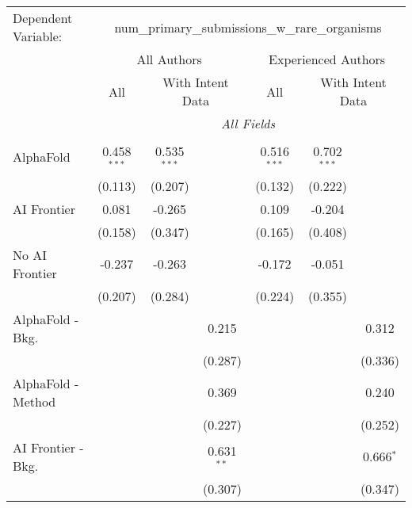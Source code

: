 \begingroup
\centering
\begin{tabular}{lcccccc}
   \tabularnewline \midrule \midrule
   Dependent Variable: & \multicolumn{6}{c}{num\_primary\_submissions\_w\_rare\_organisms}\\
 & \multicolumn{3}{c}{All Authors} & \multicolumn{3}{c}{Experienced Authors} \\
\cmidrule(lr){2-4} \cmidrule(lr){5-7}
 & \multicolumn{1}{c}{All} & \multicolumn{2}{c}{With Intent Data} & \multicolumn{1}{c}{All} & \multicolumn{2}{c}{With Intent Data} \\
\cmidrule(lr){2-2} \cmidrule(lr){3-4} \cmidrule(lr){5-5} \cmidrule(lr){6-7}
 & \multicolumn{6}{c}{\textit{All Fields}} \\ \\
   AlphaFold               & 0.458$^{***}$ & 0.535$^{***}$ &              & 0.516$^{***}$ & 0.702$^{***}$ &   \\   
                           & (0.113)       & (0.207)       &              & (0.132)       & (0.222)       &   \\   
   AI Frontier             & 0.081         & -0.265        &              & 0.109         & -0.204        &   \\   
                           & (0.158)       & (0.347)       &              & (0.165)       & (0.408)       &   \\   
   No AI Frontier          & -0.237        & -0.263        &              & -0.172        & -0.051        &   \\   
                           & (0.207)       & (0.284)       &              & (0.224)       & (0.355)       &   \\   
   AlphaFold - Bkg.        &               &               & 0.215        &               &               & 0.312\\   
                           &               &               & (0.287)      &               &               & (0.336)\\   
   AlphaFold - Method      &               &               & 0.369        &               &               & 0.240\\   
                           &               &               & (0.227)      &               &               & (0.252)\\   
   AI Frontier - Bkg.      &               &               & 0.631$^{**}$ &               &               & 0.666$^{*}$\\   
                           &               &               & (0.307)      &               &               & (0.347)\\   

\end{tabular}
